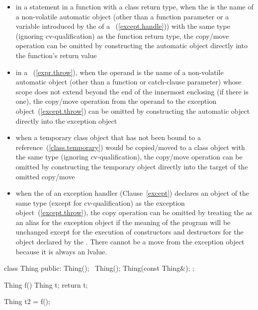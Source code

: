 \begin{itemize}
\item in a  statement in a function with a class return type,
when the  is the name of a non-volatile
automatic object (other than a function parameter or a variable
introduced by the  of a
~(\ref{except.handle}))
with the same type (ignoring cv-qualification) as
the function return type, the copy/move operation can be
omitted by constructing the automatic object directly
into the function's return value

\item in a ~(\ref{expr.throw}), when the operand
is the name of a non-volatile automatic object
(other than a function or catch-clause parameter)
whose scope does not extend beyond the end of the innermost enclosing
 (if there is one), the copy/move operation from the
operand to the exception object~(\ref{except.throw}) can be omitted by
constructing the automatic object directly into the exception object

\item when a temporary class object that has not been bound to a
reference~(\ref{class.temporary}) would be copied/moved to a class object with
the same type (ignoring cv-qualification), the copy/move operation can be omitted by constructing
the temporary object directly into the target of the omitted copy/move

\item when the  of an
exception handler (Clause~\ref{except}) declares an object of the same
type (except for cv-qualification) as the exception
object~(\ref{except.throw}), the copy operation can be omitted by treating
the  as an alias for the exception
object if the meaning of the program will be unchanged except for the execution
of constructors and destructors for the object declared by the
.
\enternote There cannot be a move from the exception object because it is
always an lvalue.  \exitnote
\end{itemize}

\enterexample

\begin{codeblock}
class Thing {
public:
  Thing();
  ~Thing();
  Thing(const Thing&);
};

Thing f() {
  Thing t;
  return t;
}

Thing t2 = f();
\end{codeblock}


